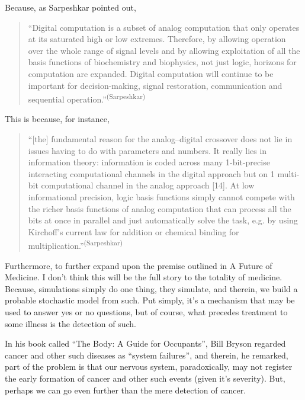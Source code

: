 Because, as Sarpeshkar pointed out,

\begin{quotation}
    ``Digital computation is a subset of analog computation that only operates at its saturated high or low extremes. Therefore, by allowing operation over the whole range of signal levels and by allowing exploitation of all the basis functions of biochemistry and biophysics, not just logic, horizons for computation are expanded. Digital computation will continue to be important for decision-making, signal restoration, communication and sequential operation.''\textsuperscript{(Sarpeshkar)}
\end{quotation}

This is because, for instance, \begin{quotation}
    ``[the] fundamental reason for the analog–digital crossover does not lie in issues having to do with parameters and numbers. It really lies in information theory: information is coded across many 1-bit-precise interacting computational channels in the digital approach but on 1 multi-bit computational channel in the analog approach [14]. At low informational precision, logic basis functions simply cannot compete with the richer basis functions of analog computation that can process all the bits at once in parallel and just automatically solve the task, e.g. by using Kirchoff’s current law for addition or chemical binding for multiplication.''\textsuperscript{(Sarpeshkar)}
\end{quotation}

Furthermore, to further expand upon the premise outlined in A Future of Medicine. I don't think this will be the full story to the totality of medicine. Because, simulations simply do one thing, they simulate, and therein, we build a probable stochastic model from such. Put simply, it's a mechanism that may be used to answer yes or no questions, but of course, what precedes treatment to some illness is the detection of such. 

In his book called ``The Body: A Guide for Occupants'', Bill Bryson regarded cancer and other such diseases as ``system failures'', and therein, he remarked, part of the problem is that our nervous system, paradoxically, may not register the early formation of cancer and other such events (given it's severity). But, perhaps we can go even further than the mere detection of cancer.

